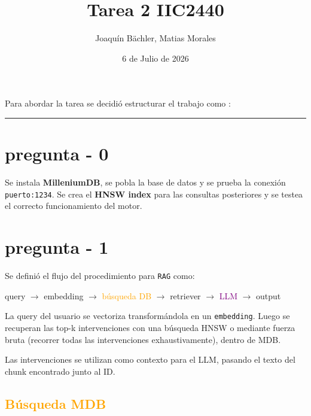 \documentclass{article}
\title{Tarea 2 IIC2440 }
\author{Joaquín Bächler, Matias Morales}
\date{6 de Julio de 2026}
\begin{document}
\maketitle

Para abordar la tarea se decidió estructurar el trabajo como :
\\

\begin{treebox}
\ttfamily\small
{}
\end{treebox}

\vspace{0.5cm}

\hrule

\newpage
\section*{pregunta - 0}

Se instala \textbf{MilleniumDB}, se pobla la base de datos y se prueba la conexión \texttt{puerto:1234}. Se crea el \textbf{HNSW index} para las consultas posteriores y se testea el correcto funcionamiento del motor. 

\newpage
\section*{pregunta - 1}

Se definió el flujo del procedimiento para \texttt{RAG} como:

\begin{mdframed}[style=simplebox]
query $\rightarrow$ embedding $\rightarrow$ \textcolor{orange}{búsqueda DB} $\rightarrow$ retriever $\rightarrow$ \textcolor{purple}{LLM} $\rightarrow$ output
\end{mdframed}

La query del usuario se vectoriza transformándola en un \texttt{embedding}. Luego se recuperan las top-k intervenciones con una búsqueda HNSW o mediante fuerza bruta (recorrer todas las intervenciones exhaustivamente), dentro de MDB.

Las intervenciones se utilizan como contexto para el LLM, pasando el texto del chunk encontrado junto al ID.

\subsection*{\textcolor{orange}{Búsqueda MDB}}
\end{document}
